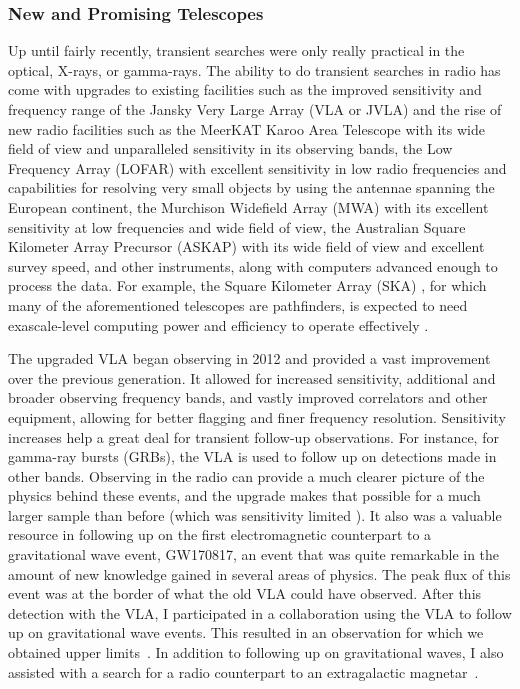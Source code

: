 \documentclass[12pt]{article}
\begin{document}
\subsubsection{New and Promising Telescopes}
Up until fairly recently, transient searches were only really practical in the optical, X-rays, or gamma-rays. The ability to do transient searches in radio has come with upgrades to existing facilities such as the improved sensitivity and frequency range of the Jansky Very Large Array (VLA or JVLA) \cite{2011ApJ...739L...1P} and the rise of new radio facilities such as the MeerKAT Karoo Area Telescope \cite{2016mks..confE...1J} with its wide field of view and unparalleled sensitivity in its observing bands, the Low Frequency Array (LOFAR) \cite{2013A&A...556A...2V} with excellent sensitivity in low radio frequencies and capabilities for resolving very small objects by using the antennae spanning the European continent, the Murchison Widefield Array (MWA) \cite{2013PASA...30....7T} with its excellent sensitivity at low frequencies and wide field of view, the Australian Square Kilometer Array Precursor (ASKAP) \cite{2014PASA...31...41H} with its wide field of view and excellent survey speed, and other instruments, along with computers advanced enough to process the data. For example, the Square Kilometer Array (SKA) \cite{2009IEEEP..97.1482D}, for which many of the aforementioned telescopes are pathfinders, is expected to need exascale-level computing power and efficiency to operate effectively \cite{doi:10.1177/1094342014549059}. 

The upgraded VLA \cite{2011ApJ...739L...1P} began observing in 2012 and provided a vast improvement over the previous generation. It allowed for increased sensitivity, additional and broader observing frequency bands, and vastly improved correlators and other equipment, allowing for better flagging and finer frequency resolution. Sensitivity increases help a great deal for transient follow-up observations. For instance, for gamma-ray bursts (GRBs), the VLA is used to follow up on detections made in other bands. Observing in the radio can provide a much clearer picture of the physics behind these events, and the upgrade makes that possible for a much larger sample than before (which was sensitivity limited \cite{Chandra_2012}). It also was a valuable resource in following up on the first electromagnetic counterpart to a gravitational wave event, GW170817, an event that was quite remarkable in the amount of new knowledge gained in several areas of physics. The peak flux of this event was at the border of what the old VLA could have observed. After this detection with the VLA, I participated in a collaboration using the VLA to follow up on gravitational wave events. This resulted in an observation for which we obtained upper limits~\citep{2019GCN.26527....1C}. In addition to following up on gravitational waves, I also assisted with a search for a radio counterpart to an extragalactic magnetar~\cite{2021Natur.589..207R}.
\end{document}
